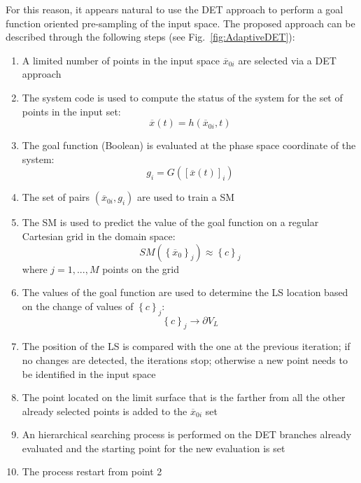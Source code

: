 \documentclass{anstrans}
\begin{document}
For this reason, it appears natural to use the DET approach to perform a goal function oriented pre-sampling of the input space. The proposed approach can be described through the following steps (see Fig.~\ref{fig:AdaptiveDET}):
\begin{enumerate}
\item A limited number of points in the input space $\overline{x}_{0i}$ are selected via a DET approach
\item The system code is used to compute the status of the system for the set of points in the input set:
\begin{equation}
    \overline{x}(t)=h(\overline{x}_{0i},t)
\end{equation}
\item The goal function (Boolean) is evaluated at the phase space coordinate of the system:
\begin{equation}
g_{i}=G([\overline{x}(t)]_{i})
\end{equation}
\item The set of pairs $(\overline{x}_{0i},g_{i})$ are used to train a SM
\item The SM is used to predict the value of the goal function on a regular Cartesian grid in the domain space:
\begin{equation}
SM\left ( \left \{ \overline{x}_{0} \right \}_{j} \right ) \approx \left \{ c \right \}_{j}
\end{equation}
where $j=1, ..., M$ points on the grid
\item The values of the goal function are used to determine the LS location based on the change of values of $\left \{ c \right \}_{j}$:
\begin{equation}
\left \{ c \right \}_{j} \rightarrow \partial V_{L}
\end{equation}
\item The position of the LS is compared with the one at the previous iteration; if no changes are detected, the iterations stop; otherwise a new point needs to be identified in the input space
\item The point located on the limit surface that is the farther from all the other already selected points is added to the $\overline{x}_{0i}$ set
\item An hierarchical searching process is performed on the DET branches already evaluated and the starting point for the new evaluation is set
\item The process restart from point 2
\end{enumerate}
\end{document}
